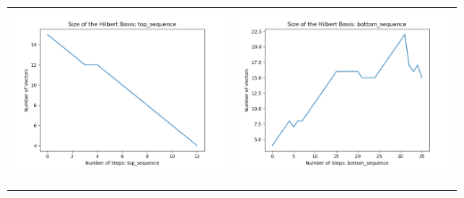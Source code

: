 \documentclass[10pt]{article}
\begin{document}
\begin{tabular}{c|c}
\begin{minipage}{.45\textwidth}
\includegraphics[width=\textwidth]{"DATA/4d/4 generators 2 bound A/top_sequence SIZE"}
\end{minipage} &
\begin{minipage}{.45\textwidth}
\includegraphics[width=\textwidth]{"DATA/4d/4 generators 2 bound A bottomup/bottom_sequence SIZE"}
\end{minipage} \\ \\
\hline \\\begin{minipage}{.45\textwidth}

\end{minipage}
\end{tabular}
\end{document}
